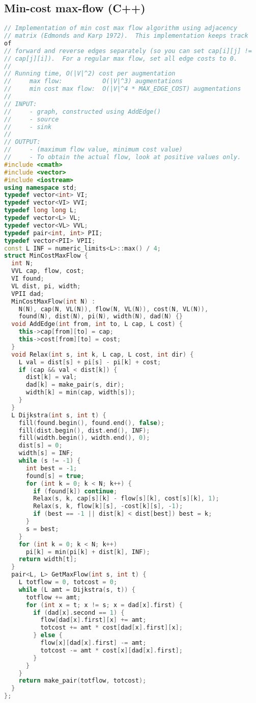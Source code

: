 \subsection{Min-cost max-flow (C++)}
\begin{lstlisting}[language=C++]
// Implementation of min cost max flow algorithm using adjacency
// matrix (Edmonds and Karp 1972).  This implementation keeps track 
of
// forward and reverse edges separately (so you can set cap[i][j] !=
// cap[j][i]).  For a regular max flow, set all edge costs to 0.
//
// Running time, O(|V|^2) cost per augmentation
//     max flow:           O(|V|^3) augmentations
//     min cost max flow:  O(|V|^4 * MAX_EDGE_COST) augmentations
//     
// INPUT: 
//     - graph, constructed using AddEdge()
//     - source
//     - sink
//
// OUTPUT:
//     - (maximum flow value, minimum cost value)
//     - To obtain the actual flow, look at positive values only.
#include <cmath>
#include <vector>
#include <iostream>
using namespace std;
typedef vector<int> VI;
typedef vector<VI> VVI;
typedef long long L;
typedef vector<L> VL;
typedef vector<VL> VVL;
typedef pair<int, int> PII;
typedef vector<PII> VPII;
const L INF = numeric_limits<L>::max() / 4;
struct MinCostMaxFlow {
  int N;
  VVL cap, flow, cost;
  VI found;
  VL dist, pi, width;
  VPII dad;
  MinCostMaxFlow(int N) : 
    N(N), cap(N, VL(N)), flow(N, VL(N)), cost(N, VL(N)), 
    found(N), dist(N), pi(N), width(N), dad(N) {}
  void AddEdge(int from, int to, L cap, L cost) {
    this->cap[from][to] = cap;
    this->cost[from][to] = cost;
  }
  void Relax(int s, int k, L cap, L cost, int dir) {
    L val = dist[s] + pi[s] - pi[k] + cost;
    if (cap && val < dist[k]) {
      dist[k] = val;
      dad[k] = make_pair(s, dir);
      width[k] = min(cap, width[s]);
    }
  }
  L Dijkstra(int s, int t) {
    fill(found.begin(), found.end(), false);
    fill(dist.begin(), dist.end(), INF);
    fill(width.begin(), width.end(), 0);
    dist[s] = 0;
    width[s] = INF;
    while (s != -1) {
      int best = -1;
      found[s] = true;
      for (int k = 0; k < N; k++) {
        if (found[k]) continue;
        Relax(s, k, cap[s][k] - flow[s][k], cost[s][k], 1);
        Relax(s, k, flow[k][s], -cost[k][s], -1);
        if (best == -1 || dist[k] < dist[best]) best = k;
      }
      s = best;
    }
    for (int k = 0; k < N; k++)
      pi[k] = min(pi[k] + dist[k], INF);
    return width[t];
  }
  pair<L, L> GetMaxFlow(int s, int t) {
    L totflow = 0, totcost = 0;
    while (L amt = Dijkstra(s, t)) {
      totflow += amt;
      for (int x = t; x != s; x = dad[x].first) {
        if (dad[x].second == 1) {
          flow[dad[x].first][x] += amt;
          totcost += amt * cost[dad[x].first][x];
        } else {
          flow[x][dad[x].first] -= amt;
          totcost -= amt * cost[x][dad[x].first];
        }
      }
    }
    return make_pair(totflow, totcost);
  }
};
\end{lstlisting}
